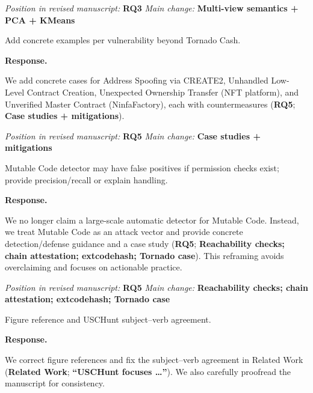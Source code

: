 \documentclass[acmsmall]{acmart}
\begin{document}
\noindent\textit{Position in revised manuscript:} {\color{red}\textbf{RQ3}}
\noindent\textit{Main change:} {\color{blue}\textbf{Multi-view semantics + PCA + KMeans}}

	\begin{tcolorbox}
		[commentbox,title=Reviewer \#2 -- Comment 4] Add concrete examples per vulnerability beyond Tornado
		Cash.
	\end{tcolorbox}

	\noindent
	\textbf{Response.}

	We add concrete cases for Address Spoofing via CREATE2, Unhandled Low-Level Contract Creation, Unexpected
	Ownership Transfer (NFT platform), and Unverified Master Contract (NinfaFactory), each with countermeasures
	({\textbf{RQ5}}; {\textbf{Case studies + mitigations}}).

\noindent\textit{Position in revised manuscript:} {\color{red}\textbf{RQ5}}
\noindent\textit{Main change:} {\color{blue}\textbf{Case studies + mitigations}}

	\begin{tcolorbox}
		[commentbox,title=Reviewer \#2 -- Comment 5] Mutable Code detector may have false positives if
		permission checks exist; provide precision/recall or explain handling.
	\end{tcolorbox}

	\noindent
	\textbf{Response.}

	We no longer claim a large-scale automatic detector for Mutable Code. Instead, we treat Mutable Code
	as an attack vector and provide concrete detection/defense guidance and a case study ({\textbf{RQ5}};
	{\textbf{Reachability checks; chain attestation; extcodehash; Tornado case}}). This reframing avoids
	overclaiming and focuses on actionable practice.

\noindent\textit{Position in revised manuscript:} {\color{red}\textbf{RQ5}}
\noindent\textit{Main change:} {\color{blue}\textbf{Reachability checks; chain attestation; extcodehash; Tornado case}}

	\begin{tcolorbox}
		[commentbox,title=Reviewer \#2 -- Typos] Figure reference and USCHunt subject--verb
		agreement.
	\end{tcolorbox}

	\noindent
	\textbf{Response.}

	We correct figure references and fix the subject–verb agreement in Related Work ({\textbf{Related Work}};
	{\textbf{“USCHunt focuses …”}}). We also carefully proofread the manuscript for consistency.
\end{document}
